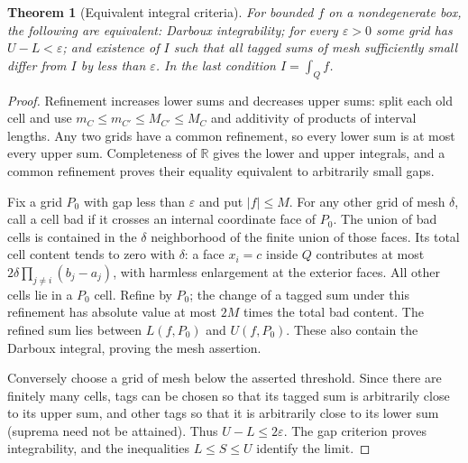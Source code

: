 \documentclass[11pt,oneside,openany]{book}
\newtheorem{theorem}{Theorem}[chapter]
\theoremstyle{definition}
\theoremstyle{remark}
\newcommand{\R}{\mathbb R}
\newcommand{\eps}{\varepsilon}
\begin{document}
\begin{theorem}[Equivalent integral criteria]\label{d04:06:criteria}
For bounded $f$ on a nondegenerate box, the following are equivalent: Darboux integrability; for every $\eps>0$ some grid has $U-L<\eps$; and existence of $I$ such that all tagged sums of mesh sufficiently small differ from $I$ by less than $\eps$. In the last condition $I=\int_Q f$.
\end{theorem}
\begin{proof}
Refinement increases lower sums and decreases upper sums: split each old cell and use $m_C\leq m_{C'}\leq M_{C'}\leq M_C$ and additivity of products of interval lengths. Any two grids have a common refinement, so every lower sum is at most every upper sum. Completeness of $\R$ gives the lower and upper integrals, and a common refinement proves their equality equivalent to arbitrarily small gaps.

Fix a grid $P_0$ with gap less than $\eps$ and put $|f|\leq M$. For any other grid of mesh $\delta$, call a cell bad if it crosses an internal coordinate face of $P_0$. The union of bad cells is contained in the $\delta$ neighborhood of the finite union of those faces. Its total cell content tends to zero with $\delta$: a face $x_i=c$ inside $Q$ contributes at most $2\delta\prod_{j\ne i}(b_j-a_j)$, with harmless enlargement at the exterior faces. All other cells lie in a $P_0$ cell. Refine by $P_0$; the change of a tagged sum under this refinement has absolute value at most $2M$ times the total bad content. The refined sum lies between $L(f,P_0)$ and $U(f,P_0)$. These also contain the Darboux integral, proving the mesh assertion.

Conversely choose a grid of mesh below the asserted threshold. Since there are finitely many cells, tags can be chosen so that its tagged sum is arbitrarily close to its upper sum, and other tags so that it is arbitrarily close to its lower sum (suprema need not be attained). Thus $U-L\leq2\eps$. The gap criterion proves integrability, and the inequalities $L\leq S\leq U$ identify the limit.
\end{proof}
\end{document}
